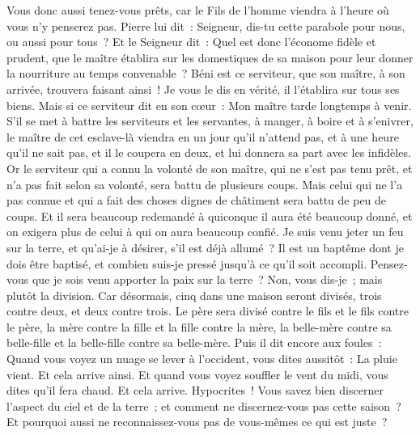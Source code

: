 \begin{multicols}{2}
Vous donc aussi tenez-vous prêts, car le Fils de l'homme viendra à l'heure où vous n'y penserez pas.
Pierre lui dit~: Seigneur, dis-tu cette parabole pour nous, ou aussi pour tous~?
Et le Seigneur dit~: Quel est donc l'économe fidèle et prudent, que le maître établira sur les domestiques de sa maison pour leur donner la nourriture au temps convenable~?
Béni est ce serviteur, que son maître, à son arrivée, trouvera faisant ainsi~!
Je vous le dis en vérité, il l'établira sur tous ses biens.
Mais si ce serviteur dit en son cœur~: Mon maître tarde longtemps à venir. S'il se met à battre les serviteurs et les servantes, à manger, à boire et à s'enivrer,
le maître de cet esclave-là viendra en un jour qu'il n'attend pas, et à une heure qu'il ne sait pas, et il le coupera en deux, et lui donnera sa part avec les infidèles.
Or le serviteur qui a connu la volonté de son maître, qui ne s'est pas tenu prêt, et n'a pas fait selon sa volonté, sera battu de plusieurs coups.
 Mais celui qui ne l'a pas connue et qui a fait des choses dignes de châtiment sera battu de peu de coups. Et il sera beaucoup redemandé à quiconque il aura été beaucoup donné, et on exigera plus de celui à qui on aura beaucoup confié.
Je suis venu jeter un feu sur la terre, et qu'ai-je à désirer, s'il est déjà allumé~?
Il est un baptême dont je dois être baptisé, et combien suis-je pressé jusqu'à ce qu'il soit accompli.
Pensez-vous que je sois venu apporter la paix sur la terre~? Non, vous dis-je~; mais plutôt la division.
Car désormais, cinq dans une maison seront divisés, trois contre deux, et deux contre trois.
Le père sera divisé contre le fils et le fils contre le père, la mère contre la fille et la fille contre la mère, la belle-mère contre sa belle-fille et la belle-fille contre sa belle-mère.
Puis il dit encore aux foules~: Quand vous voyez un nuage se lever à l'occident, vous dites aussitôt~: La pluie vient. Et cela arrive ainsi.
Et quand vous voyez souffler le vent du midi, vous dites qu'il fera chaud. Et cela arrive.
Hypocrites~! Vous savez bien discerner l'aspect du ciel et de la terre~; et comment ne discernez-vous pas cette saison~?
Et pourquoi aussi ne reconnaissez-vous pas de vous-mêmes ce qui est juste~?

\end{multicols}
